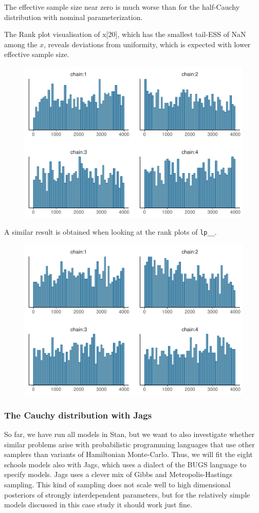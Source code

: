 \documentclass[american,]{article}
\begin{document}
The effective sample size near zero is much worse than for the
half-Cauchy distribution with nominal parameterization.

The Rank plot visualisation of x{[}20{]}, which has the smallest
tail-ESS of NaN among the \(x\), reveals deviations from uniformity,
which is expected with lower effective sample size.

\begin{figure}[tp]
  \centering
  \includegraphics[width=0.6\linewidth]{graphics/hist-fit-half-reparam-1.pdf}
\end{figure}

A similar result is obtained when looking at the rank plots of
\texttt{lp\_\_}.

\begin{figure}[tp]
  \centering
  \includegraphics[width=0.6\linewidth]{graphics/hist-fit-half-reparam-lp-1.pdf}
\end{figure}

\hypertarget{the-cauchy-distribution-with-jags}{%
\subsubsection*{The Cauchy distribution with
Jags}\label{the-cauchy-distribution-with-jags}}

So far, we have run all models in Stan, but we want to also investigate
whether similar problems arise with probabilistic programming languages
that use other samplers than variants of Hamiltonian Monte-Carlo. Thus,
we will fit the eight schools models also with Jags, which uses a
dialect of the BUGS language to specify models. Jags uses a clever mix
of Gibbs and Metropolis-Hastings sampling. This kind of sampling does
not scale well to high dimensional posteriors of strongly interdependent
parameters, but for the relatively simple models discussed in this case
study it should work just fine.
\end{document}
